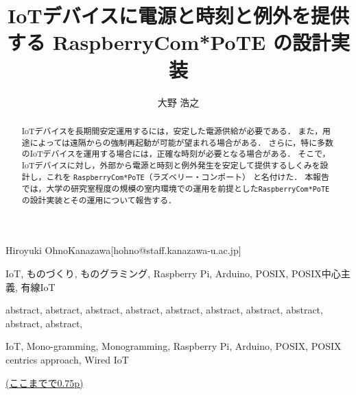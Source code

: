 \title{
  IoTデバイスに電源と時刻と例外を提供する RaspberryCom*PoTE の設計実装
}



\author{大野 浩之}{Hiroyuki Ohno}{Kanazawa}[hohno@staff.kanazawa-u.ac.jp]


\begin{abstract}
IoTデバイスを長期間安定運用するには，安定した電源供給が必要である．
また，用途によっては遠隔からの強制再起動が可能が望まれる場合がある．
さらに，特に多数のIoTデバイスを運用する場合には，正確な時刻が必要となる場合がある．
そこで，IoTデバイスに対し，外部から電源と時刻と例外発生を安定して提供するしくみを設計し，これを {\tt RaspberryCom*PoTE}（ラズベリー・コンポート） と名付けた．
本報告では，大学の研究室程度の規模の室内環境での運用を前提とした{\tt Raspberry\-Com*PoTE}の設計実装とその運用について報告する．
\end{abstract}

\begin{jkeyword}
IoT, ものづくり, ものグラミング, Raspberry Pi, Arduino, POSIX, POSIX中心主義, 有線IoT
\end{jkeyword}


\begin{eabstract}
abstract, abstract, abstract, abstract, abstract, abstract, abstract, abstract, abstract, abstract,
\end{eabstract}

\begin{ekeyword}
IoT, Mono-gramming, Monogramming, Raspberry Pi, Arduino, POSIX, POSIX centrics approach, Wired IoT
\end{ekeyword}

\maketitle


\underline{(ここまでで0.75p)}\\


